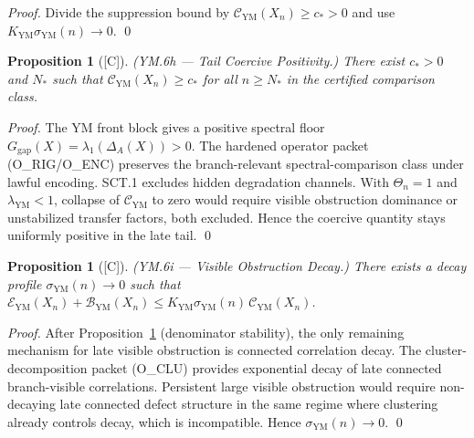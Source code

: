 \documentclass[12pt,oneside]{amsbook}
\theoremstyle{plain}
\newtheorem{proposition}[theorem]{Proposition}
\theoremstyle{definition}
\theoremstyle{remark}
\newcommand{\status}[1]{\textup{[#1]}}
\begin{document}
\begin{proof}
Divide the suppression bound by $\mathcal{C}_{\mathrm{YM}}(X_n) \geq
c_* > 0$ and use $K_{\mathrm{YM}}\sigma_{\mathrm{YM}}(n) \to 0$. \qed
\end{proof}

\begin{proposition}[\status{C}]\label{prop:YM6h}
\textup{(YM.6h --- Tail Coercive Positivity.)}
There exist $c_* > 0$ and $N_*$ such that
$\mathcal{C}_{\mathrm{YM}}(X_n) \geq c_*$ for all $n \geq N_*$
in the certified comparison class.
\end{proposition}

\begin{proof}
The YM front block gives a positive spectral floor
$G_{\mathrm{gap}}(X) = \lambda_1(\Delta_A(X)) > 0$. The hardened
operator packet (O\_RIG/O\_ENC) preserves the branch-relevant
spectral-comparison class under lawful encoding. SCT.1 excludes
hidden degradation channels. With $\Theta_n = 1$ and
$\lambda_{\mathrm{YM}} < 1$, collapse of
$\mathcal{C}_{\mathrm{YM}}$ to zero would require visible obstruction
dominance or unstabilized transfer factors, both excluded. Hence
the coercive quantity stays uniformly positive in the late tail. \qed
\end{proof}

\begin{proposition}[\status{C}]\label{prop:YM6i}
\textup{(YM.6i --- Visible Obstruction Decay.)}
There exists a decay profile $\sigma_{\mathrm{YM}}(n) \to 0$ such
that $\mathcal{E}_{\mathrm{YM}}(X_n) + \mathcal{B}_{\mathrm{YM}}(X_n)
\leq K_{\mathrm{YM}}\sigma_{\mathrm{YM}}(n)\,\mathcal{C}_{\mathrm{YM}}(X_n)$.
\end{proposition}

\begin{proof}
After Proposition~\ref{prop:YM6h} (denominator stability), the only
remaining mechanism for late visible obstruction is connected
correlation decay. The cluster-decomposition packet (O\_CLU) provides
exponential decay of late connected branch-visible correlations.
Persistent large visible obstruction would require non-decaying late
connected defect structure in the same regime where clustering already
controls decay, which is incompatible. Hence $\sigma_{\mathrm{YM}}(n)
\to 0$. \qed
\end{proof}
\end{document}
